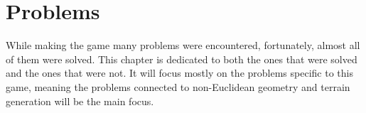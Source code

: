 \chapter{Problems} \label{ch:problems}
While making the game many problems were encountered, fortunately, almost all of them were solved.
This chapter is dedicated to both the ones that were solved and the ones that were not.
It will focus mostly on the problems specific to this game, meaning the problems connected to non-Euclidean geometry and terrain generation will be the main focus.




